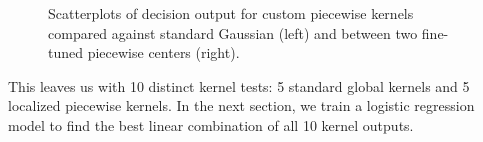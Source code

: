 \begin{figure}[H]
    \caption{Scatterplots of decision output for custom piecewise kernels compared against standard Gaussian (left) and between two fine-tuned piecewise centers (right).}
    \label{fig:piecewise_scatter}
\end{figure}

This leaves us with 10 distinct kernel tests: 5 standard global kernels and 5 localized piecewise kernels. In the next section, we train a logistic regression model to find the best linear combination of all 10 kernel outputs.
